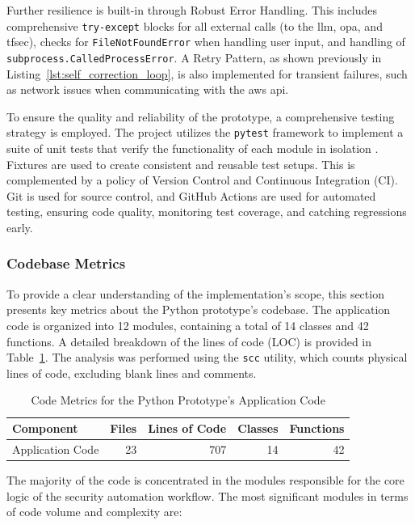 Further resilience is built-in through Robust Error Handling. This includes comprehensive \texttt{try-except} blocks for all external calls (to the \gls{llm}, \gls{opa}, and tfsec), checks for \texttt{FileNotFoundError} when handling user input, and handling of \texttt{subprocess.CalledProcessError}. A Retry Pattern, as shown previously in Listing~\ref{lst:self_correction_loop}, is also implemented for transient failures, such as network issues when communicating with the \gls{aws} \gls{api}.

To ensure the quality and reliability of the prototype, a comprehensive testing strategy is employed. The project utilizes the \texttt{pytest} framework to implement a suite of unit tests that verify the functionality of each module in isolation \cite{noauthor_pytest_nodate}. Fixtures are used to create consistent and reusable test setups. This is complemented by a policy of Version Control and Continuous Integration (CI). Git is used for source control, and GitHub Actions are used for automated testing, ensuring code quality, monitoring test coverage, and catching regressions early.

\subsubsection{Codebase Metrics}

To provide a clear understanding of the implementation's scope, this section presents key metrics about the Python prototype's codebase. The application code is organized into 12 modules, containing a total of 14 classes and 42 functions. A detailed breakdown of the lines of code (LOC) is provided in Table~\ref{tab:code_metrics}. The analysis was performed using the \texttt{scc}\cite{boyter_scc_2024} utility, which counts physical lines of code, excluding blank lines and comments.

\begin{table}[htbp]
\centering
\caption{Code Metrics for the Python Prototype's Application Code}
\label{tab:code_metrics}
\begin{tabular}{lrrrr}
\toprule
\textbf{Component} & \textbf{Files} & \textbf{Lines of Code} & \textbf{Classes} & \textbf{Functions} \\
\midrule
Application Code & 23 & 707 & 14 & 42 \\
\bottomrule
\end{tabular}
\end{table}

The majority of the code is concentrated in the modules responsible for the core logic of the security automation workflow. The most significant modules in terms of code volume and complexity are:

